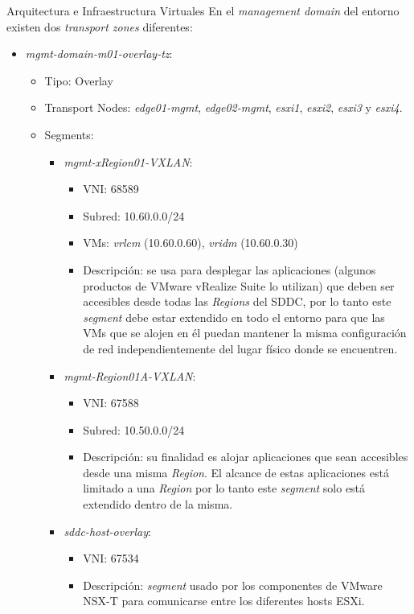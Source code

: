\begin{subsection}{Arquitectura e Infraestructura Virtuales\cite{CFVirtInfraes}}
En el \textit{management domain} del entorno existen dos \textit{transport zones} diferentes:
\begin{itemize}
  \item \textit{mgmt-domain-m01-overlay-tz}:
    \begin{itemize}
      \item Tipo: Overlay
      \item Transport Nodes: \textit{edge01-mgmt}, \textit{edge02-mgmt}, \textit{esxi1}, \textit{esxi2}, \textit{esxi3} y \textit{esxi4}.
      \item Segments:
        \begin{itemize}
          \item \textit{mgmt-xRegion01-VXLAN}:
            \begin{itemize}
              \item VNI: 68589
              \item Subred: 10.60.0.0/24
              \item VMs: \textit{vrlcm} (10.60.0.60), \textit{vridm} (10.60.0.30)
              \item Descripción: se usa para desplegar las aplicaciones (algunos productos de VMware vRealize Suite lo utilizan) que deben ser accesibles desde todas las \textit{Regions} del SDDC, por lo tanto este \textit{segment} debe estar extendido en todo el entorno para que las VMs que se alojen en él puedan mantener la misma configuración de red independientemente del lugar físico donde se encuentren.
            \end{itemize}
          \item \textit{mgmt-Region01A-VXLAN}:
            \begin{itemize}
              \item VNI: 67588
              \item Subred: 10.50.0.0/24
              \item Descripción: su finalidad es alojar aplicaciones que sean accesibles desde una misma \textit{Region}. El alcance de estas aplicaciones está limitado a una \textit{Region} por lo tanto este \textit{segment} solo está extendido dentro de la misma.
            \end{itemize}
          \item \textit{sddc-host-overlay}:
            \begin{itemize}
              \item VNI: 67534
              \item Descripción: \textit{segment} usado por los componentes de VMware NSX-T para comunicarse entre los diferentes hosts ESXi.

\end{itemize}
\end{itemize}
\end{itemize}
\end{itemize}
\end{subsection}
